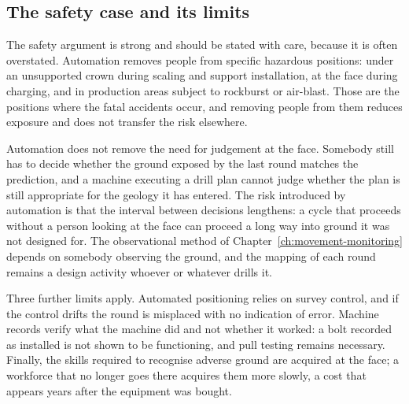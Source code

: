 \subsection{The safety case and its limits}
\label{sec:automation-safety}

The safety argument is strong and should be stated with care, because it is
often overstated. Automation removes people from specific hazardous positions:
under an unsupported crown during scaling and support installation, at the
face during charging, and in production areas subject to rockburst or
air-blast. Those are the positions where the fatal accidents occur, and
removing people from them reduces exposure and does not transfer the risk
elsewhere.

Automation does not remove the need for judgement at the face. Somebody
still has to decide whether the ground exposed by the last round matches the
prediction, and a machine executing a drill plan cannot judge whether the
plan is still appropriate for the geology it has entered. The risk introduced
by automation is that the interval between decisions lengthens: a cycle that
proceeds without a person looking at the face can proceed a long way into
ground it was not designed for. The observational method of
Chapter~\ref{ch:movement-monitoring} depends on somebody observing the ground,
and the mapping of each round remains a design activity whoever or whatever
drills it.

Three further limits apply. Automated positioning relies on
survey control, and if the control drifts the round is misplaced with no
indication of error. Machine records verify what the machine did and not
whether it worked: a bolt recorded as installed is not shown to be functioning,
and pull testing remains necessary. Finally, the skills required to recognise
adverse ground are acquired at
the face; a workforce that no longer goes there acquires them more slowly,
a cost that appears years after the equipment was
bought.

\chapterreferences
